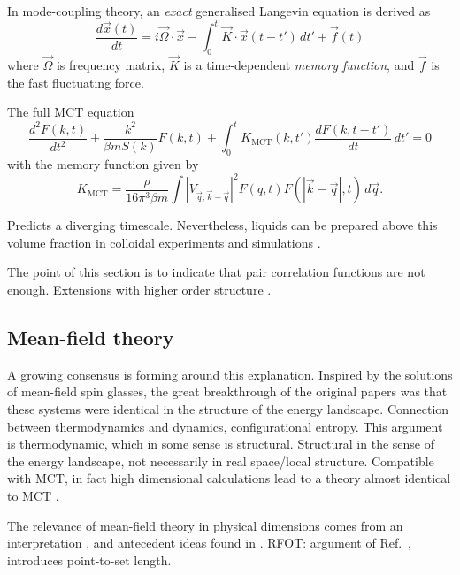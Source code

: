 In mode-coupling theory, an \emph{exact} generalised Langevin equation is derived as
\begin{equation}
  \frac{d \vec{x}(t)}{dt}
  =
  i \vec{\Omega} \cdot \vec{x}
  - \int_0^t \vec{K} \cdot \vec{x}(t - t') \, dt'
  + \vec{f}(t)
\end{equation}
where $\vec{\Omega}$ is frequency matrix, $\vec{K}$ is a time-dependent \emph{memory function}, and $\vec{f}$ is the fast fluctuating force.

The full MCT equation
\begin{equation}
  \frac{d^2 F(k,t)}{d t^2}
  + \frac{k^2}{\beta m S(k)} F(k, t)
  + \int_0^t K_\mathrm{MCT}(k, t') \frac{d F(k, t - t')}{dt} \, dt'
  =
  0
\end{equation}
with the memory function given by
\begin{equation}
  K_\mathrm{MCT}
  =
  \frac{\rho}{16 \pi^3 \beta m}
  \int |V_{\vec{q},\vec{k}-\vec{q}}|^2
  F(q, t) F(|\vec{k} - \vec{q}|, t)
  \, d\vec{q}.
\end{equation}

Predicts a diverging timescale.
Nevertheless, liquids can be prepared above this volume fraction in colloidal experiments \cite{BrambillaPRL2009} and simulations \cite{BerthierPRL2016}.

The point of this section is to indicate that pair correlation functions are not enough.
Extensions with higher order structure \cite{JanssenPRL2015,JanssenFP2018}.

\subsection{Mean-field theory}

A growing consensus is forming around this explanation.
Inspired by the solutions of mean-field spin glasses, the great breakthrough of the original papers was that these systems were identical in the structure of the energy landscape.
Connection between thermodynamics and dynamics, configurational entropy.
This argument is thermodynamic, which in some sense is structural.
Structural in the sense of the energy landscape, not necessarily in real space/local structure.
Compatible with MCT, in fact high dimensional calculations lead to a theory almost identical to MCT \cite{MaimbourgPRL2016,KurchanJSM2016}.

The relevance of mean-field theory in physical dimensions comes from an interpretation \cite{KirkpatrickPRB1987, KirkpatrickPRA1989}, and antecedent ideas found in \cite{AdamJCP1965}.
RFOT: argument of Ref.\ \cite{BouchaudJCP2004}, introduces point-to-set length.

